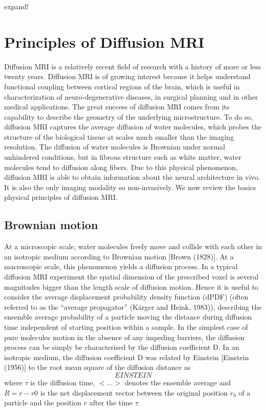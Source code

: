 expand!


\section{Principles of Diffusion MRI}
Diffusion MRI is a relatively recent field of research with a history of more or less twenty years. Diffusion MRI is of growing interest because it helps understand functional coupling between cortical regions of the brain, which is useful in characterization of neuro-degenerative diseases, in surgical planning and in other medical applications. The great success of diffusion MRI comes from its capability to describe the geometry of the underlying microstructure. To do so, diffusion MRI captures the average diffusion of water molecules, which probes the structure of the biological tissue at scales much smaller than the imaging resolution. The diffusion of water molecules is Brownian under normal unhindered conditions, but in fibrous structure such as white matter, water molecules tend to diffusion along fibers. Due to this physical phenomenon, diffusion MRI is able to obtain information about the neural architecture in vivo. It is also the only imaging modality so non-invasively. We now review the basics physical principles of diffusion MRI.

\subsection{Brownian motion}
At a microscopic scale, water molecules freely move and collide with each other in an isotropic medium according to Brownian motion [Brown (1828)]. At a macroscopic scale, this phenomenon yields a diffusion process. In a typical diffusion MRI experiment the spatial dimension of the prescribed voxel is several magnitudes bigger than the length scale of diffusion motion. Hence it is useful to consider the average displacement probability density function (dPDF) (often referred to as the “average propagator” (Kärger and Heink, 1983)), describing the ensemble average probability of a particle moving the distance  during diffusion time  independent of starting position  within a sample. In the simplest case of pure molecules motion in the absence of any impeding barriers, the diffusion process can be simply be characterised by the diffusion coefficient D\citep{Fick}. In an isotropic medium, the diffusion coefficient D was related by Einstein [Einstein (1956)] to the root mean square of the diffusion distance as
\begin{equation}
	EINSTEIN
\end{equation}
where $\tau$ is the diffusion time, $<...>$ denotes the ensemble average and $R = r − r0$ is the net displacement vector between the original position $r_0$ of a particle and the position $r$ after the time $\tau$. 

